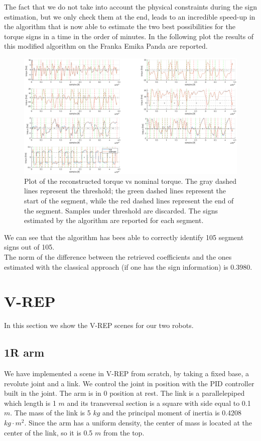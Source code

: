 \documentclass{article}
\begin{document}
The fact that we do not take into account the physical constraints during the sign estimation, but we only check them at the end, leads to an incredible speed-up in the algorithm that is now able to estimate the two best possibilities for the torque signs in a time in the order of minutes.
In the following plot the results of this modified algorithm on the Franka Emika Panda are reported.
\FloatBarrier
\begin{figure}
\centering
\includegraphics[width=1\textwidth]{images/franka_result_crop.eps}
\caption{Plot of the reconstructed torque vs nominal torque. The gray dashed lines represent the threshold; the green dashed lines represent the start of the segment, while the red dashed lines represent the end of the segment. Samples under threshold are discarded. The signs estimated by the algorithm are reported for each segment.}
\end{figure}
\FloatBarrier

We can see that the algorithm has bees able to correctly identify 105 segment signs out of 105.\\
The norm of the difference between the retrieved coefficients and the ones estimated with the classical approach (if one has the sign information) is 0.3980.

\section{V-REP}
In this section we show the V-REP scenes for our two robots.

\subsection{1R arm}We have implemented a scene in V-REP from scratch, by taking a fixed base, a revolute joint and a link. We control the joint in position with the PID controller built in the joint. The arm is in 0 position at rest. The link is a parallelepiped which length is 1 $m$ and its transversal section is a square with side equal to 0.1 $m$. The mass of the link is 5 $kg$ and the principal moment of inertia is 0.4208 $kg\cdot m^2$. Since the arm has a uniform density, the center of mass is located at the center of the link, so it is 0.5 $m$ from the top.
\end{document}
